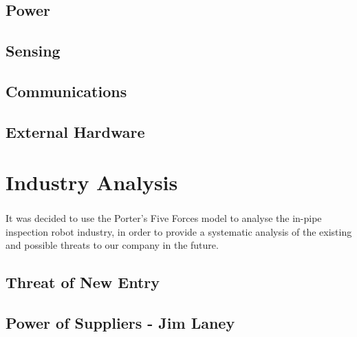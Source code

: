 \documentclass[11pt]{article}		%
\begin{document}
		\subsection{Power}
		
		\subsection{Sensing}
		
		\subsection{Communications}
		
		\subsection{External Hardware}
			
	\section{Industry Analysis}
		
		It was decided to use the Porter's Five Forces model\textsuperscript{\cite{porter2008five}} to analyse the in-pipe inspection robot industry, in order to provide a systematic analysis of the existing and possible threats to our company in the future.
		
		\subsection[Threat of Entry]{Threat of New Entry}
				
		\subsection[Power of Suppliers]{Power of Suppliers - Jim Laney}
			
\end{document}
